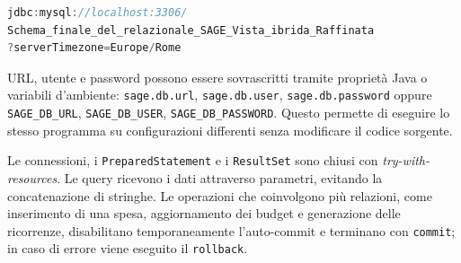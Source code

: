\documentclass[11pt,a4paper]{article}
\begin{document}
\begin{lstlisting}[language=Java,caption={Configurazione predefinita della connessione JDBC}]
jdbc:mysql://localhost:3306/
Schema_finale_del_relazionale_SAGE_Vista_ibrida_Raffinata
?serverTimezone=Europe/Rome
\end{lstlisting}

URL, utente e password possono essere sovrascritti tramite proprietà Java o variabili d'ambiente: \texttt{sage.db.url}, \texttt{sage.db.user}, \texttt{sage.db.password} oppure \texttt{SAGE\_DB\_URL}, \texttt{SAGE\_DB\_USER}, \texttt{SAGE\_DB\_PASSWORD}. Questo permette di eseguire lo stesso programma su configurazioni differenti senza modificare il codice sorgente.

Le connessioni, i \texttt{PreparedStatement} e i \texttt{ResultSet} sono chiusi con \emph{try-with-resources}. Le query ricevono i dati attraverso parametri, evitando la concatenazione di stringhe. Le operazioni che coinvolgono più relazioni, come inserimento di una spesa, aggiornamento dei budget e generazione delle ricorrenze, disabilitano temporaneamente l'auto-commit e terminano con \texttt{commit}; in caso di errore viene eseguito il \texttt{rollback}.
\end{document}
